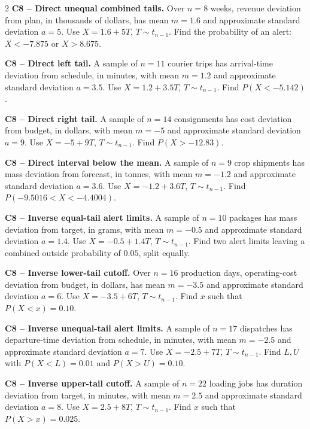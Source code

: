 \begin{multicols}{2}
\textbf{C8 -- Direct unequal combined tails.} Over $n=8$ weeks, revenue deviation from plan, in thousands of dollars, has mean $m=1.6$ and approximate standard deviation $a=5$. Use $X=1.6+5T$, $T\sim t_{n-1}$.
Find the probability of an alert: $X<-7.875$ or $X>8.675$. 

\textbf{C8 -- Direct left tail.} A sample of $n=11$ courier trips has arrival-time deviation from schedule, in minutes, with mean $m=1.2$ and approximate standard deviation $a=3.5$. Use $X=1.2+3.5T$, $T\sim t_{n-1}$.
Find $P(X<-5.142)$. 

\textbf{C8 -- Direct right tail.} A sample of $n=14$ consignments has cost deviation from budget, in dollars, with mean $m=-5$ and approximate standard deviation $a=9$. Use $X=-5+9T$, $T\sim t_{n-1}$.
Find $P(X>-12.83)$. 

\textbf{C8 -- Direct interval below the mean.} A sample of $n=9$ crop shipments has mass deviation from forecast, in tonnes, with mean $m=-1.2$ and approximate standard deviation $a=3.6$. Use $X=-1.2+3.6T$, $T\sim t_{n-1}$.
Find $P(-9.5016<X<-4.4004)$. 

\textbf{C8 -- Inverse equal-tail alert limits.} A sample of $n=10$ packages has mass deviation from target, in grams, with mean $m=-0.5$ and approximate standard deviation $a=1.4$. Use $X=-0.5+1.4T$, $T\sim t_{n-1}$.
Find two alert limits leaving a combined outside probability of $0.05$, split equally. 

\textbf{C8 -- Inverse lower-tail cutoff.} Over $n=16$ production days, operating-cost deviation from budget, in dollars, has mean $m=-3.5$ and approximate standard deviation $a=6$. Use $X=-3.5+6T$, $T\sim t_{n-1}$.
Find $x$ such that $P(X<x)=0.10$. 

\textbf{C8 -- Inverse unequal-tail alert limits.} A sample of $n=17$ dispatches has departure-time deviation from schedule, in minutes, with mean $m=-2.5$ and approximate standard deviation $a=7$. Use $X=-2.5+7T$, $T\sim t_{n-1}$.
Find $L,U$ with $P(X<L)=0.01$ and $P(X>U)=0.10$. 

\textbf{C8 -- Inverse upper-tail cutoff.} A sample of $n=22$ loading jobs has duration deviation from target, in minutes, with mean $m=2.5$ and approximate standard deviation $a=8$. Use $X=2.5+8T$, $T\sim t_{n-1}$.
Find $x$ such that $P(X>x)=0.025$. 


\end{multicols}
